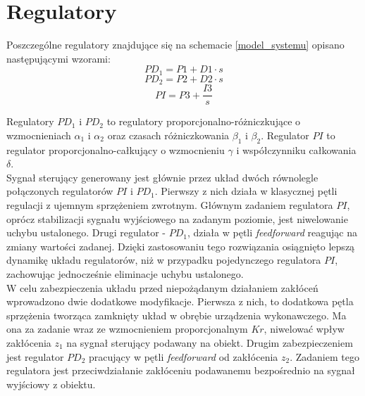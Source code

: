 \section{Regulatory}
Poszczególne regulatory znajdujące się na schemacie \ref{model_systemu} opisano następującymi wzorami: 
\begin{equation}\label{reg1}
PD_1 = P1+D1 \cdot s
\end{equation}
\begin{equation}\label{reg2}
PD_2 = P2+D2 \cdot s
\end{equation}
\begin{equation}\label{reg3}
PI = P3 + \dfrac{I3}{s}
\end{equation}

Regulatory $PD_1$ i $PD_2$ to regulatory proporcjonalno-różniczkujące o wzmocnieniach $\alpha_1$ i $\alpha_2$ oraz czasach różniczkowania $\beta_1$ i $\beta_2$. Regulator $PI$ to regulator proporcjonalno-całkujący o wzmocnieniu $\gamma$ i współczynniku całkowania $\delta$. \\
Sygnał sterujący generowany jest głównie przez układ dwóch równolegle połączonych regulatorów  $PI$ i $PD_1$. Pierwszy z nich działa w klasycznej pętli regulacji z ujemnym sprzężeniem zwrotnym. Głównym zadaniem regulatora $PI$, oprócz stabilizacji sygnału wyjściowego na zadanym poziomie, jest niwelowanie uchybu ustalonego. Drugi regulator - $PD_1$, działa w pętli \textit{feedforward} reagując na zmiany wartości zadanej. Dzięki zastosowaniu tego rozwiązania osiągnięto lepszą dynamikę układu regulatorów, niż w przypadku pojedynczego regulatora $PI$, zachowując jednocześnie   eliminacje uchybu ustalonego. \\
W celu zabezpieczenia układu przed niepożądanym działaniem zakłóceń wprowadzono dwie dodatkowe modyfikacje. Pierwsza z nich, to dodatkowa pętla sprzężenia tworząca zamknięty układ w obrębie urządzenia wykonawczego. Ma ona za zadanie wraz ze wzmocnieniem proporcjonalnym $Kr$, niwelować wpływ zakłócenia $z_1$ na sygnał sterujący podawany na obiekt.  Drugim zabezpieczeniem jest regulator $PD_2$ pracujący w pętli \textit{feedforward} od zakłócenia $z_2$. Zadaniem tego regulatora jest przeciwdziałanie zakłóceniu podawanemu bezpośrednio na sygnał wyjściowy z obiektu.

